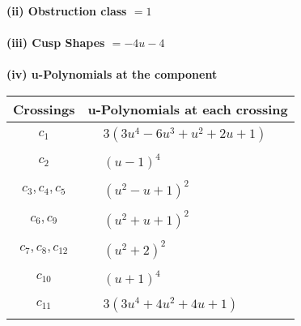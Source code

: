 \documentclass[1p]{elsarticle_modified}
\theoremstyle{definition}
\begin{document}
\flushleft \textbf{(ii) Obstruction class $= 1$}\\~\\
\flushleft \textbf{(iii) Cusp Shapes $= -4 u-4$}\\~\\
\newpage\renewcommand{\arraystretch}{1}
\flushleft \textbf{(iv) u-Polynomials at the component}\newline \\
\begin{tabular}{m{50pt}|m{274pt}}
Crossings & \hspace{64pt}u-Polynomials at each crossing \\
\hline $$\begin{aligned}c_{1}\end{aligned}$$&$\begin{aligned}
&3(3 u^4-6 u^3+u^2+2 u+1)
\end{aligned}$\\
\hline $$\begin{aligned}c_{2}\end{aligned}$$&$\begin{aligned}
&(u-1)^4
\end{aligned}$\\
\hline $$\begin{aligned}c_{3},c_{4},c_{5}\end{aligned}$$&$\begin{aligned}
&(u^2- u+1)^2
\end{aligned}$\\
\hline $$\begin{aligned}c_{6},c_{9}\end{aligned}$$&$\begin{aligned}
&(u^2+u+1)^2
\end{aligned}$\\
\hline $$\begin{aligned}c_{7},c_{8},c_{12}\end{aligned}$$&$\begin{aligned}
&(u^2+2)^2
\end{aligned}$\\
\hline $$\begin{aligned}c_{10}\end{aligned}$$&$\begin{aligned}
&(u+1)^4
\end{aligned}$\\
\hline $$\begin{aligned}c_{11}\end{aligned}$$&$\begin{aligned}
&3(3 u^4+4 u^2+4 u+1)
\end{aligned}$\\
\hline
\end{tabular}\\~\\
\end{document}
